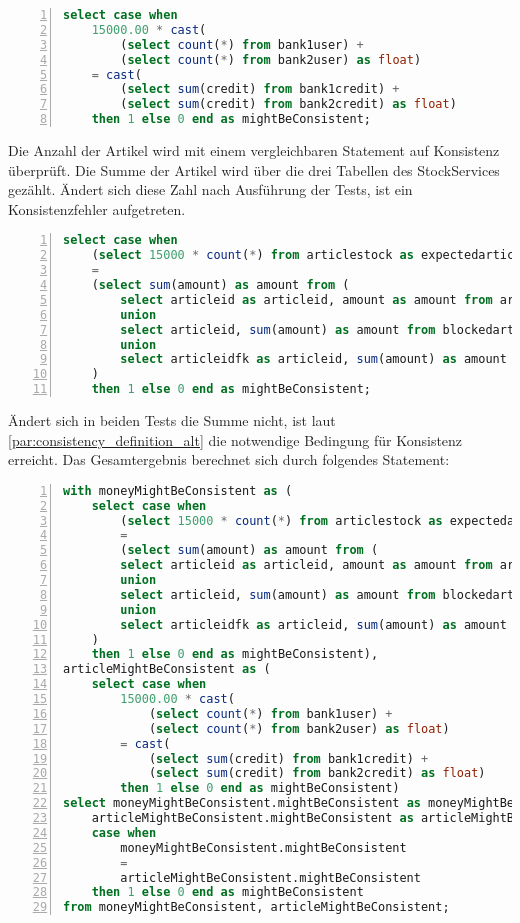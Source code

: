 \begin{lstlisting}[language=SQL, breaklines=true, tabsize=2, showstringspaces=false, frame=single, numbers=left, basicstyle=\small] 
select case when 
	15000.00 * cast(
		(select count(*) from bank1user) + 
		(select count(*) from bank2user) as float) 
	= cast(
		(select sum(credit) from bank1credit) + 
		(select sum(credit) from bank2credit) as float)
	then 1 else 0 end as mightBeConsistent;
\end{lstlisting}\label{}

Die Anzahl der Artikel wird mit einem vergleichbaren Statement auf Konsistenz überprüft. Die Summe der Artikel wird über die drei Tabellen des StockServices gezählt. Ändert sich diese Zahl nach Ausführung der Tests, ist ein Konsistenzfehler aufgetreten.

\begin{lstlisting}[language=SQL, breaklines=true, tabsize=2, showstringspaces=false, frame=single, numbers=left, basicstyle=\small] 
select case when 
	(select 15000 * count(*) from articlestock as expectedarticlesum) 
	= 
	(select sum(amount) as amount from (
		select articleid as articleid, amount as amount from articlestock
		union
		select articleid, sum(amount) as amount from blockedarticles group by articleid
		union
		select articleidfk as articleid, sum(amount) as amount from shippedarticles group by articleidfk) as actualarticlesum
	)
	then 1 else 0 end as mightBeConsistent;
\end{lstlisting}\label{}

Ändert sich in beiden Tests die Summe nicht, ist laut \cref{par:consistency_definition_alt} die notwendige Bedingung für Konsistenz erreicht. Das Gesamtergebnis berechnet sich durch folgendes Statement:
\begin{lstlisting}[language=SQL, breaklines=true, tabsize=2, showstringspaces=false, frame=single, numbers=left, basicstyle=\small] 
with moneyMightBeConsistent as (
	select case when 
		(select 15000 * count(*) from articlestock as expectedarticlesum) 
		= 
		(select sum(amount) as amount from (
		select articleid as articleid, amount as amount from articlestock
		union
		select articleid, sum(amount) as amount from blockedarticles group by articleid
		union
		select articleidfk as articleid, sum(amount) as amount from shippedarticles group by articleidfk) as actualarticlesum
	)
	then 1 else 0 end as mightBeConsistent),
articleMightBeConsistent as (
	select case when 
		15000.00 * cast(
			(select count(*) from bank1user) + 
			(select count(*) from bank2user) as float) 
		= cast(
			(select sum(credit) from bank1credit) + 
			(select sum(credit) from bank2credit) as float)
		then 1 else 0 end as mightBeConsistent) 
select moneyMightBeConsistent.mightBeConsistent as moneyMightBeConsistent,
	articleMightBeConsistent.mightBeConsistent as articleMightBeConsistent,
	case when 
		moneyMightBeConsistent.mightBeConsistent 
		= 
		articleMightBeConsistent.mightBeConsistent 
	then 1 else 0 end as mightBeConsistent
from moneyMightBeConsistent, articleMightBeConsistent;
\end{lstlisting}\label{}

